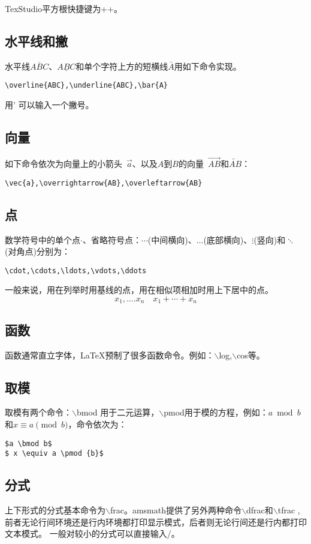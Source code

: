 TexStudio平方根快捷键为++。

\subsection{水平线和撇}

水平线$\overline{ABC}$、$\underline{ABC}$和单个字符上方的短横线$\bar{A}$用如下命令实现。
\begin{lstlisting}
\overline{ABC},\underline{ABC},\bar{A}
\end{lstlisting}
用' 可以输入一个撇号。

\subsection{向量}
如下命令依次为向量上的小箭头~$\vec{a}$、以及$A$到$B$的向量~$\overrightarrow{AB}$和$\overleftarrow{AB}$：
\begin{lstlisting}
\vec{a},\overrightarrow{AB},\overleftarrow{AB}
\end{lstlisting}

\subsection{点}
数学符号中的单个点$\cdot$、省略符号点：$\cdots$(中间横向)、$\ldots$(底部横向)、$\vdots$(竖向)和$\ddots$(对角点)分别为：
\begin{lstlisting}
\cdot,\cdots,\ldots,\vdots,\ddots
\end{lstlisting}
一般来说，用在列举时用基线的点，用在相似项相加时用上下居中的点。
\[x_{1},\ldots.x_{n} \quad x_{1}+\cdots + x_{n}\]

\subsection{函数}
函数通常直立字体，\LaTeX{}预制了很多函数命令。例如：$\backslash$log,$\backslash$cos等。

\subsection{取模}
取模有两个命令：$\backslash$bmod 用于二元运算，$\backslash$pmod用于模的方程，例如：$a\bmod b$和$ x\equiv a\pmod{b}$，命令依次为：
\begin{lstlisting}
$a \bmod b$
$ x \equiv a \pmod {b}$
\end{lstlisting}

\subsection{分式}
上下形式的分式基本命令为$\backslash$frac。amsmath提供了另外两种命令$\backslash$dfrac和$\backslash$tfrac , 前者无论行间环境还是行内环境都打印显示模式，后者则无论行间还是行内都打印文本模式。 一般对较小的分式可以直接输入/。

